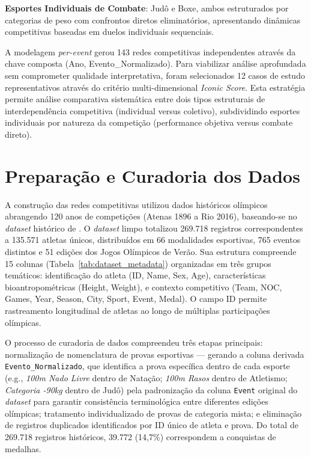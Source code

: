 \textbf{Esportes Individuais de Combate}: Judô e Boxe, ambos estruturados por categorias de peso com confrontos diretos eliminatórios, apresentando dinâmicas competitivas baseadas em duelos individuais sequenciais.

A modelagem \textit{per-event} gerou 143 redes competitivas independentes através da chave composta (Ano, Evento\_Normalizado). Para viabilizar análise aprofundada sem comprometer qualidade interpretativa, foram selecionados 12 casos de estudo representativos através do critério multi-dimensional \textit{Iconic Score}{}. Esta estratégia permite análise comparativa sistemática entre dois tipos estruturais de interdependência competitiva (individual versus coletivo), subdividindo esportes individuais por natureza da competição (performance objetiva versus combate direto).

\section{Preparação e Curadoria dos Dados}

A construção das redes competitivas utilizou dados históricos olímpicos abrangendo 120 anos de competições (Atenas 1896 a Rio 2016), baseando-se no \textit{dataset} histórico de . O \textit{dataset} limpo totalizou 269.718 registros correspondentes a 135.571 atletas únicos, distribuídos em 66 modalidades esportivas, 765 eventos distintos e 51 edições dos Jogos Olímpicos de Verão. Sua estrutura compreende 15 colunas (Tabela~\ref{tab:dataset_metadata}) organizadas em três grupos temáticos: identificação do atleta (ID, Name, Sex, Age), características bioantropométricas (Height, Weight), e contexto competitivo (Team, NOC, Games, Year, Season, City, Sport, Event, Medal). O campo ID permite rastreamento longitudinal de atletas ao longo de múltiplas participações olímpicas.



O processo de curadoria de dados compreendeu três etapas principais: normalização de nomenclatura de provas esportivas --- gerando a coluna derivada \texttt{Evento\_Normalizado}, que identifica a prova específica dentro de cada esporte (e.g., \textit{100m Nado Livre} dentro de Natação; \textit{100m Rasos} dentro de Atletismo; \textit{Categoria -90kg} dentro de Judô) pela padronização da coluna \texttt{Event} original do \textit{dataset} para garantir consistência terminológica entre diferentes edições olímpicas; tratamento individualizado de provas de categoria mista; e eliminação de registros duplicados identificados por ID único de atleta e prova. Do total de 269.718 registros históricos, 39.772 (14,7\%) correspondem a conquistas de medalhas.

